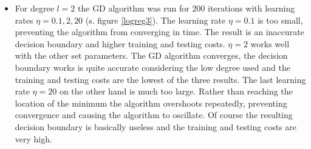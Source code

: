 \documentclass{article}
\begin{document}
\begin{itemize}
\item For degree $l=2$ the GD algorithm was run for 200 iterations with learning rates $\eta=0.1,2,20$ (s. figure \ref{logreg3}). The learning rate $\eta = 0.1$ is too small, preventing the algorithm from converging in time. The result is an inaccurate decision boundary and higher training and testing costs. $\eta = 2$ works well with the other set parameters. The GD algorithm converges, the decision boundary works is quite accurate considering the low degree used and the training and testing costs are the lowest of the three results. The last learning rate  $\eta=20$ on the other hand is much too large. Rather than reaching the location of the minimum the algorithm overshoots repeatedly, preventing convergence and causing the algorithm to oscillate. Of course the resulting decision boundary is basically useless and the training and testing costs are very high.


\end{itemize}
\end{document}

